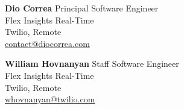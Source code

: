 \item \textbf{Dio Correa} \hfill {Principal Software Engineer}\\
            Flex Insights Real-Time\\
            Twilio, Remote\\
            \faEnvelope \hspace{0.5mm}
            \href{mailto:contact@diocorrea.com}{contact@diocorrea.com}
        
\item \textbf{William Hovnanyan} \hfill {Staff Software Engineer}\\
    Flex Insights Real-Time\\
    Twilio, Remote\\
    \faEnvelope \hspace{0.5mm} \href{mailto:whovnanyan@twilio.com}{whovnanyan@twilio.com}